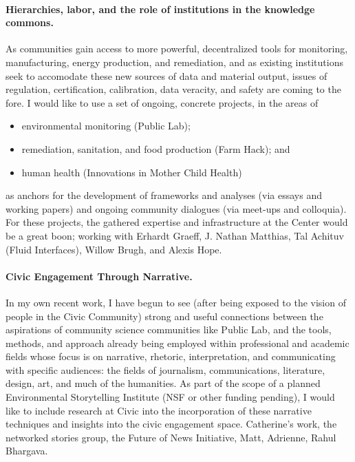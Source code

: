 \documentclass[12pt]{article}
\begin{document}
\paragraph{Hierarchies, labor, and the role of institutions in the knowledge commons.} As communities gain access to more powerful, decentralized tools for monitoring, manufacturing, energy production, and remediation, and as existing institutions seek to accomodate these new sources of data and material output, issues of regulation, certification, calibration, data veracity, and safety are coming to the fore.  I would like to use a set of ongoing, concrete projects, in the areas of 

\begin{itemize}
\item environmental monitoring (Public Lab);
\item remediation, sanitation, and food production (Farm Hack); and 
\item human health (Innovations in Mother Child Health) 
\end{itemize}

as anchors for the development of frameworks and analyses (via essays and working papers) and ongoing community dialogues (via meet-ups and colloquia).  For these projects, the gathered expertise and infrastructure at the Center would be a great boon; working with Erhardt Graeff, J. Nathan Matthias, Tal Achituv (Fluid Interfaces), Willow Brugh, and Alexis Hope. 

\paragraph{Civic Engagement Through Narrative.} In my own recent work, I have begun to see (after being exposed to the vision of people in the Civic Community) strong and useful connections between the aspirations of community science communities like Public Lab, and the tools, methods, and approach already being employed within professional and academic fields whose focus is on narrative, rhetoric, interpretation, and communicating with specific audiences:  the fields of journalism, communications, literature, design, art, and much of the humanities.  As part of the scope of a planned Environmental Storytelling Institute (NSF or other funding pending), I would like to include research at Civic into the incorporation of these narrative techniques and insights into the civic engagement space. Catherine's work, the networked stories group, the Future of News Initiative, Matt, Adrienne, Rahul Bhargava. 
\end{document}
